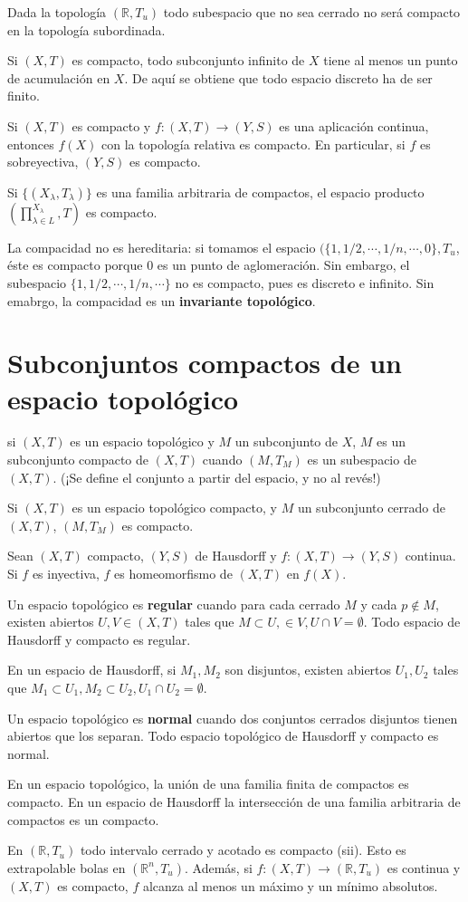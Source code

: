 \documentclass[a4paper, 11pt]{extarticle}
\begin{document}
Dada la topología \((\mathbb{R}, T_u)\) todo subespacio que no sea cerrado no
será compacto en la topología subordinada.

Si \((X,T)\) es compacto, todo subconjunto infinito de \(X\) tiene al menos
un punto de acumulación en \(X\). De aquí se obtiene que todo espacio discreto
ha de ser finito.

Si \((X,T)\) es compacto y \(f:  (X,T) \rightarrow  (Y, S)\) es una
aplicación continua, entonces \(f(X)\) con la topología relativa es compacto.
En particular, si \(f\) es sobreyectiva, \((Y,S)\) es compacto.

Si \(\{ (X_\lambda, T_\lambda) \}\) es una familia arbitraria de compactos, el
espacio producto \((\prod_{\lambda \in L}^{X_\lambda}, T)\) es compacto. 

La compacidad no es hereditaria: si tomamos el espacio \((\{ 1, 1/2, \cdots, 1/n,
\cdots, 0 \},T_u\), éste es compacto porque 0 es un punto de aglomeración. Sin
embargo, el subespacio \(\{ 1, 1/2, \cdots, 1/n, \cdots \}\) no es compacto,
pues es discreto e infinito. Sin emabrgo, la compacidad es un \textbf{invariante topológico}.

\section{Subconjuntos compactos de un espacio topológico}
\label{sec:org7c71a5e}
si \((X,T)\) es un espacio topológico y \(M\) un subconjunto de \(X\), \(M\) es un subconjunto compacto de \((X,T)\) cuando \((M, T_M)\) es un
subespacio de \((X,T)\). (¡Se define el conjunto a partir del espacio, y no al
revés!)

Si \((X,T)\) es un espacio topológico compacto, y \(M\) un subconjunto
cerrado de \((X,T)\), \((M, T_M)\) es compacto. 

Sean \((X,T)\) compacto, \((Y,S)\) de Hausdorff y \(f: (X,T) \rightarrow
(Y,S)\) continua. Si \(f\) es inyectiva, \(f\) es homeomorfismo de \((X,T)\) en \(f(X)\).

Un espacio topológico es \textbf{regular} cuando para cada cerrado \(M\) y cada \(p
\not \in M\), existen abiertos \(U,V \in (X,T)\) tales que \(M \subset U, 
\in V, U \cap V = \emptyset\). Todo espacio de Hausdorff y compacto es regular.

En un espacio de Hausdorff, si \(M_1, M_2\) son disjuntos, existen abiertos \(U_1, U_2\) tales que \(M_1 \subset U_1, M_2 \subset U_2, U_1 \cap U_2 =
\emptyset\). 

Un espacio topológico es \textbf{normal} cuando dos conjuntos cerrados disjuntos tienen
abiertos que los separan. Todo espacio topológico de Hausdorff y compacto es
normal.

En un espacio topológico, la unión de una familia finita de compactos es
compacto. En un espacio de Hausdorff la intersección de una familia arbitraria
de compactos es un compacto.

En \(( \mathbb{R}, T_u)\) todo intervalo cerrado y acotado es compacto (sii).
Esto es extrapolable  bolas en \((\mathbb{R}^n, T_u)\). Además, si \(f:(X,T)
\rightarrow (\mathbb{R}, T_u)\) es continua y \((X,T)\) es compacto, \(f\)
alcanza al menos un máximo y un mínimo absolutos.
\end{document}
